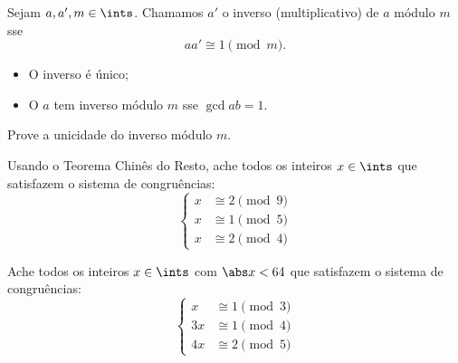 \begin{definition}
    Sejam $a,a',m\in\ints$. Chamamos $a'$ o inverso (multiplicativo) de $a$ módulo $m$ sse
    $$
        aa'\cong 1\pmod m.
    $$
    \begin{itemize}[--]
        \item O inverso é único;
        \item O $a$ tem inverso módulo $m$ sse $\gcd a b = 1.$
    \end{itemize}
\end{definition}

\begin{exercise}
    Prove a unicidade do inverso módulo $m$. 
\end{exercise}

\begin{exercise}
    Usando o Teorema Chinês do Resto, ache todos os inteiros $x\in\ints$ que satisfazem o sistema de congruências:
    $$
    \left\{
        \begin{aligned}
            x&\cong 2\pmod 9\\
            x&\cong 1\pmod 5\\
            x&\cong 2\pmod 4
        \end{aligned}
    \right.
    $$
\end{exercise}

\begin{exercise}
    Ache todos os inteiros $x\in\ints$ com $\abs x < 64$ que satisfazem o sistema de congruências:
    $$
    \left\{
        \begin{aligned}
            x &\cong 1\pmod 3\\
            3x&\cong 1\pmod 4\\
            4x&\cong 2\pmod 5
        \end{aligned}
    \right.
    $$
\end{exercise}

